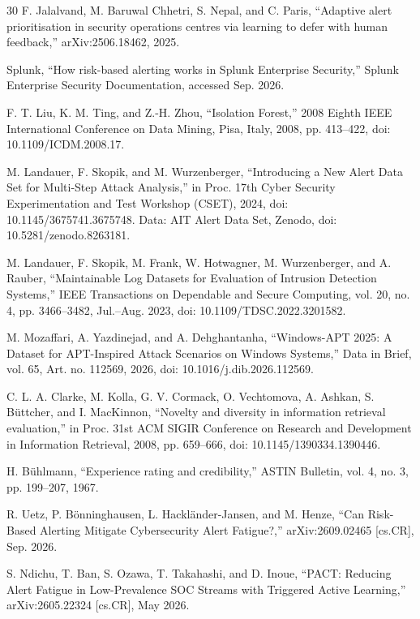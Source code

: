 \documentclass[conference]{IEEEtran}
\begin{document}
\begin{thebibliography}{30}
 F. Jalalvand, M. Baruwal Chhetri, S. Nepal, and C. Paris, ``Adaptive alert prioritisation in security operations centres via learning to defer with human feedback,'' arXiv:2506.18462, 2025.

 Splunk, ``How risk-based alerting works in Splunk Enterprise Security,'' Splunk Enterprise Security Documentation, accessed Sep. 2026.

 F. T. Liu, K. M. Ting, and Z.-H. Zhou, ``Isolation Forest,'' 2008 Eighth IEEE International Conference on Data Mining, Pisa, Italy, 2008, pp. 413--422, doi: 10.1109/ICDM.2008.17.

 M. Landauer, F. Skopik, and M. Wurzenberger, ``Introducing a New Alert Data Set for Multi-Step Attack Analysis,'' in Proc. 17th Cyber Security Experimentation and Test Workshop (CSET), 2024, doi: 10.1145/3675741.3675748. Data: AIT Alert Data Set, Zenodo, doi: 10.5281/zenodo.8263181.

 M. Landauer, F. Skopik, M. Frank, W. Hotwagner, M. Wurzenberger, and A. Rauber, ``Maintainable Log Datasets for Evaluation of Intrusion Detection Systems,'' IEEE Transactions on Dependable and Secure Computing, vol. 20, no. 4, pp. 3466--3482, Jul.--Aug. 2023, doi: 10.1109/TDSC.2022.3201582.

 M. Mozaffari, A. Yazdinejad, and A. Dehghantanha, ``Windows-APT 2025: A Dataset for APT-Inspired Attack Scenarios on Windows Systems,'' Data in Brief, vol. 65, Art. no. 112569, 2026, doi: 10.1016/j.dib.2026.112569.

 C. L. A. Clarke, M. Kolla, G. V. Cormack, O. Vechtomova, A. Ashkan, S. B\"uttcher, and I. MacKinnon, ``Novelty and diversity in information retrieval evaluation,'' in Proc. 31st ACM SIGIR Conference on Research and Development in Information Retrieval, 2008, pp. 659--666, doi: 10.1145/1390334.1390446.

 H. B\"uhlmann, ``Experience rating and credibility,'' ASTIN Bulletin, vol. 4, no. 3, pp. 199--207, 1967.

 R. Uetz, P. B\"onninghausen, L. Hackl\"ander-Jansen, and M. Henze, ``Can Risk-Based Alerting Mitigate Cybersecurity Alert Fatigue?,'' arXiv:2609.02465 [cs.CR], Sep. 2026.

 S. Ndichu, T. Ban, S. Ozawa, T. Takahashi, and D. Inoue, ``PACT: Reducing Alert Fatigue in Low-Prevalence SOC Streams with Triggered Active Learning,'' arXiv:2605.22324 [cs.CR], May 2026.


\end{thebibliography}
\end{document}
